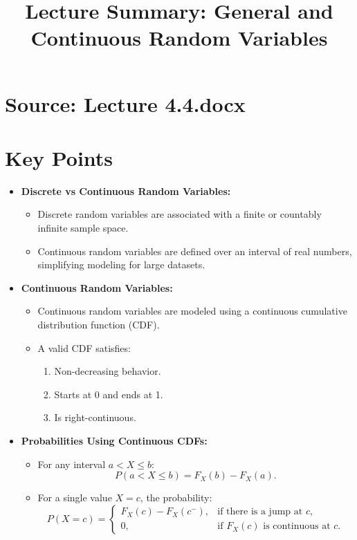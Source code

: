 \documentclass{article}
\title{Lecture Summary: General and Continuous Random Variables}
\author{}
\date{}
\begin{document}
\maketitle

\section*{Source: Lecture 4.4.docx}

\section*{Key Points}

\begin{itemize}
  \item \textbf{Discrete vs Continuous Random Variables:}
    \begin{itemize}
      \item Discrete random variables are associated with a finite or countably infinite sample space.
      \item Continuous random variables are defined over an interval of real numbers, simplifying modeling for large datasets.
    \end{itemize}

  \item \textbf{Continuous Random Variables:}
    \begin{itemize}
      \item Continuous random variables are modeled using a continuous cumulative distribution function (CDF).
      \item A valid CDF satisfies:
        \begin{enumerate}
          \item Non-decreasing behavior.
          \item Starts at 0 and ends at 1.
          \item Is right-continuous.
        \end{enumerate}
    \end{itemize}

  \item \textbf{Probabilities Using Continuous CDFs:}
    \begin{itemize}
      \item For any interval $a < X \leq b$:
        \[
          P(a < X \leq b) = F_X(b) - F_X(a).
        \]
      \item For a single value $X = c$, the probability:
        \[
          P(X = c) =
          \begin{cases}
            F_X(c) - F_X(c^-), & \text{if there is a jump at } c, \\
            0, & \text{if } F_X(c) \text{ is continuous at } c.
          \end{cases}
        \]
    \end{itemize}


\end{itemize}
\end{document}
